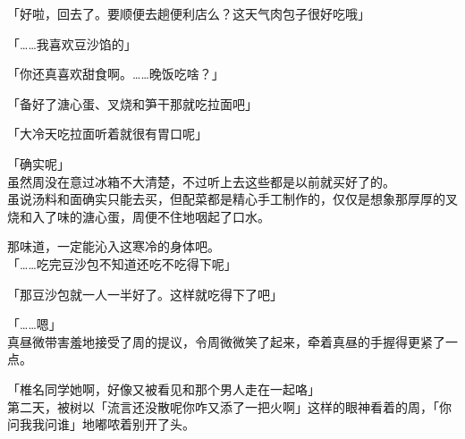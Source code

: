 「好啦，回去了。要顺便去趟便利店么？这天气肉包子很好吃哦」

「……我喜欢豆沙馅的」

「你还真喜欢甜食啊。……晚饭吃啥？」

「备好了溏心蛋、叉烧和笋干那就吃拉面吧」

「大冷天吃拉面听着就很有胃口呢」

「确实呢」\\

虽然周没在意过冰箱不大清楚，不过听上去这些都是以前就买好了的。\\

虽说汤料和面确实只能去买，但配菜都是精心手工制作的，仅仅是想象那厚厚的叉烧和入了味的溏心蛋，周便不住地咽起了口水。

那味道，一定能沁入这寒冷的身体吧。\\

「……吃完豆沙包不知道还吃不吃得下呢」

「那豆沙包就一人一半好了。这样就吃得下了吧」

「……嗯」\\

真昼微带害羞地接受了周的提议，令周微微笑了起来，牵着真昼的手握得更紧了一点。\\

\vspace{2\baselineskip}

「椎名同学她啊，好像又被看见和那个男人走在一起咯」\\

第二天，被树以「流言还没散呢你咋又添了一把火啊」这样的眼神看着的周，「你问我我问谁」地嘟哝着别开了头。